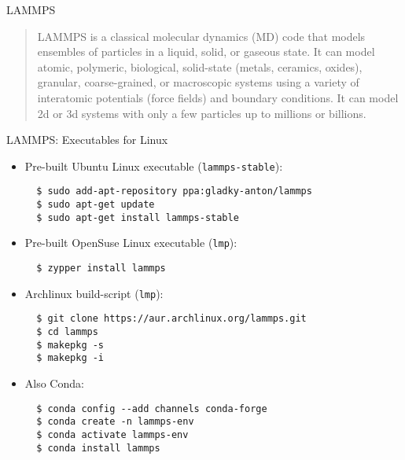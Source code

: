 \documentclass[10pt]{beamer}
\begin{document}
\begin{frame}{LAMMPS}
  \begin{quote}
    LAMMPS is a classical molecular dynamics (MD) code that models ensembles of particles in a liquid, solid, or gaseous state. It can model atomic, polymeric, biological, solid-state (metals, ceramics, oxides), granular, coarse-grained, or macroscopic systems using a variety of interatomic potentials (force fields) and boundary conditions. It can model 2d or 3d systems with only a few particles up to millions or billions.
  \end{quote}
\end{frame}

\begin{frame}[fragile]{LAMMPS: Executables for Linux}
  \begin{itemize}
    \item Pre-built Ubuntu Linux executable (\texttt{lammps-stable}):
    \begin{lstlisting}
  $ sudo add-apt-repository ppa:gladky-anton/lammps
  $ sudo apt-get update
  $ sudo apt-get install lammps-stable
    \end{lstlisting}

    \item Pre-built OpenSuse Linux executable (\texttt{lmp}):
    \begin{lstlisting}
  $ zypper install lammps
    \end{lstlisting}

    \item Archlinux build-script (\texttt{lmp}):
    \begin{lstlisting}
  $ git clone https://aur.archlinux.org/lammps.git
  $ cd lammps
  $ makepkg -s
  $ makepkg -i
    \end{lstlisting}

    \item Also Conda:
    \begin{lstlisting}
  $ conda config --add channels conda-forge
  $ conda create -n lammps-env
  $ conda activate lammps-env
  $ conda install lammps
    \end{lstlisting}
  \end{itemize}
\end{frame}
\end{document}
